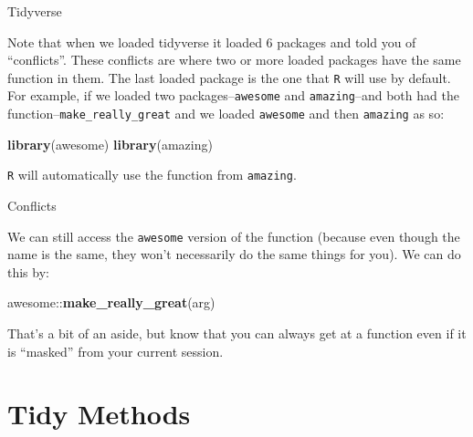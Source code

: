 \documentclass[ignorenonframetext,]{beamer}
\newenvironment{Shaded}{\begin{snugshade}}{\end{snugshade}}
\newcommand{\KeywordTok}[1]{\textcolor[rgb]{0.13,0.29,0.53}{\textbf{{#1}}}}
\newcommand{\NormalTok}[1]{{#1}}
\begin{document}
\begin{frame}[fragile]{Tidyverse}

Note that when we loaded tidyverse it loaded 6 packages and told you of
``conflicts''. These conflicts are where two or more loaded packages
have the same function in them. The last loaded package is the one that
\texttt{R} will use by default. For example, if we loaded two
packages--\texttt{awesome} and \texttt{amazing}--and both had the
function--\texttt{make\_really\_great} and we loaded \texttt{awesome}
and then \texttt{amazing} as so:

\begin{Shaded}
\begin{Highlighting}[]
\KeywordTok{library}\NormalTok{(awesome)}
\KeywordTok{library}\NormalTok{(amazing)}
\end{Highlighting}
\end{Shaded}

\texttt{R} will automatically use the function from \texttt{amazing}.

\end{frame}

\begin{frame}[fragile]{Conflicts}

We can still access the \texttt{awesome} version of the function
(because even though the name is the same, they won't necessarily do the
same things for you). We can do this by:

\begin{Shaded}
\begin{Highlighting}[]
\NormalTok{awesome::}\KeywordTok{make_really_great}\NormalTok{(arg)}
\end{Highlighting}
\end{Shaded}

That's a bit of an aside, but know that you can always get at a function
even if it is ``masked'' from your current session.

\end{frame}

\section{Tidy Methods}\label{tidy-methods}
\end{document}
